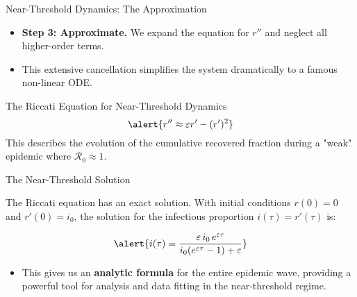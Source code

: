 \documentclass[14pt,aspectratio=169]{beamer}
\newcommand{\RR}{\mathcal{R}_0}
\begin{document}
\begin{frame}{Near-Threshold Dynamics: The Approximation}
    \begin{itemize}
        \item \textbf{Step 3: Approximate.} We expand the equation for $r''$ and neglect all higher-order terms.
        \item This extensive cancellation simplifies the system dramatically to a famous non-linear ODE.
    \end{itemize}
    \begin{alertblock}{The Riccati Equation for Near-Threshold Dynamics}
    \[ \alert{r'' \approx \varepsilon r' - (r')^2} \]
    This describes the evolution of the cumulative recovered fraction during a "weak" epidemic where $\RR \approx 1$.
    \end{alertblock}
\end{frame}


\begin{frame}{The Near-Threshold Solution}
    \begin{block}{The Riccati equation has an exact solution.}
        With initial conditions $r(0)=0$ and $r'(0)=i_0$, the solution for the infectious proportion $i(\tau) = r'(\tau)$ is:
    \end{block}
    \[
    \alert{i(\tau) = \frac{\varepsilon\,i_0\,e^{\varepsilon\tau}}{i_0(e^{\varepsilon\tau}-1)+\varepsilon}}
    \]
    \begin{itemize}
        \item This gives us an \textbf{analytic formula} for the entire epidemic wave, providing a powerful tool for analysis and data fitting in the near-threshold regime.
    \end{itemize}
\end{frame}
\end{document}
